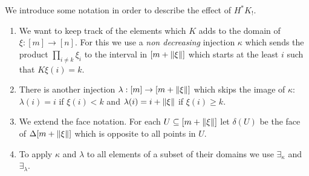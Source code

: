 \documentclass{amsart}
\theoremstyle{plain}
\theoremstyle{definition}
\newcommand\hide[1]{}
\newcommand\set[1]{\left\{#1\right\}}
\begin{document}
\hide{What $\hat K_!$ does to this horn, depends of whether $\Delta(\xi)$ factors though $h:\Lambda_k[n] \to \Delta[n]$. If $\xi\in (H_k[n])_0$, $\hat K_!$ has no effect. The pullback of $\Lambda_l[m] \to \Delta[m]$ along $h$ is however just $\Delta[m]_l \to \Delta[m]$.
\[\xymatrix{
\Lambda_l[m] \ar[r]\ar[d]\pb & \Delta[m] \ar[r]\ar[d]\pb & \Lambda_k[n] \ar[d]^h\\
\Lambda_l[m] \ar[r] & \Delta[m] \ar[r]_{\Delta(\xi)}\ar[ur] & \Delta[n]
}\]
If only this were so easy for all the horns.

If $\xi \not\in (H_k[n])_0$, then the effect of $\hat K_!$ is not trivial. The codomain of the horn becomes:
\[  \hat K_!(\Delta(\xi)) = \Delta(K\xi): \Delta[m+1] \to \Delta[n] \]
The functor $\hat K_!$ treats each of the faces $\delta^m_i:\Delta[m-1]\to \Lambda_l[m]$ differently based on whether $\xi\circ \delta^m_i\in (H_k[n])_0$ or not. In order to describe the result we introduce the following notation.
}

We introduce some notation in order to describe the effect of $H^*K_!$.

\newcommand\face\delta %
\newcommand\ka\kappa
\newcommand\la\lambda
\newcommand\im{\exists_}
\begin{enumerate}
\item We want to keep track of the elements which $K$ adds to the domain of $\xi:[m]\to[n]$. For this we use a \emph{non decreasing} injection $\ka$ which sends the product $\prod_{i\neq k}\xi_i$ to the interval in $[m+\left\Vert\xi\right\Vert]$ which starts at the least $i$ such that $K\xi(i)=k$.


\item There is another injection $\la:[m]\to[m+\norm\xi]$ which skips the image of $\ka$: $\la(i)=i$ if $\xi(i)<k$ and $\la(i)=i+\norm\xi$ if $\xi(i)\geq k$.
\item We extend the face notation. For each $U\subseteq [m+\left\Vert\xi\right\Vert]$ let $\face(U)$ be the face of $\Delta[m+\left\Vert\xi\right\Vert]$ which is opposite to all points in $U$.
\item To apply $\ka$ and $\la$ to all elements of a subset of their domains we use $\im \ka$ and $\im\la$.
\end{enumerate}

\hide{
\begin{enumerate} %
\item We want to keep track of the point which $\hat K$ added to $\Delta[m]$:
\[ \ka = \min\set{i\in[m+1]|K\xi(i) = k} \]
\item The top $l$ of the horn $\Lambda_l[m]$, shifts to $l+1$ if $l\geq p$. We use $\la$ to refer to whatever the position of the top becomes in $\Delta[m+1]$. Note that $\la\neq \ka$.
\item The morphism $K\xi$ partitions $[m+1]$ into intervals, which we want to keep track of. Let $\Xi_j = \set{i\in [m+1]|K\xi(i) = j}$.
\end{enumerate}}
\end{document}
